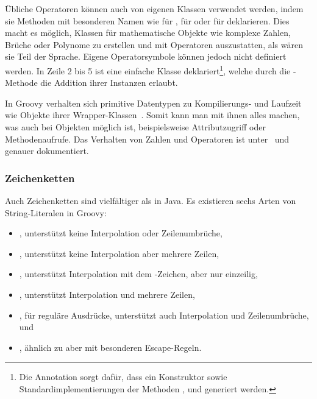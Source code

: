 \documentclass[a4paper]{article}
\begin{document}
Übliche Operatoren können auch von eigenen Klassen verwendet werden, indem sie Methoden mit besonderen Namen wie  für \code{+},  für \code{<<} oder  für \code{++} deklarieren.
Dies macht es möglich, Klassen für mathematische Objekte wie komplexe Zahlen, Brüche oder Polynome zu erstellen und mit Operatoren auszustatten, als wären sie Teil der Sprache.
Eigene Operatorsymbole können jedoch nicht definiert werden.
In Zeile 2 bis 5 ist eine einfache Klasse  deklariert\footnote{Die Annotation  sorgt dafür, dass ein Konstruktor sowie Standardimplementierungen der Methoden ,  und  generiert werden.}, welche durch die -Methode die Addition ihrer Instanzen erlaubt.

In Groovy verhalten sich primitive Datentypen zu Kompilierungs- und Laufzeit wie Objekte ihrer Wrapper-Klassen~\cite[Abs.~3.2.10.]{groovy-lang:documentation}.
Somit kann man mit ihnen alles machen, was auch bei Objekten möglich ist, beispielsweise Attributzugriff oder Methodenaufrufe.
Das Verhalten von Zahlen und Operatoren ist unter~\cite[Abs.~1.1.5.]{groovy-lang:documentation} und~\cite[Abs.~1.2.]{groovy-lang:documentation} genauer dokumentiert.

\subsubsection{Zeichenketten}\label{subsubsec:strings}

Auch Zeichenketten sind vielfältiger als in Java.
Es existieren sechs Arten von String-Literalen in Groovy:

\begin{itemize}\setlength{\itemsep}{0pt}\setlength{\parskip}{0pt}\setlength{\parsep}{0pt}
\item {}, unterstützt keine Interpolation oder Zeilenumbrüche,
\item {}, unterstützt keine Interpolation aber mehrere Zeilen,
\item {}, unterstützt Interpolation mit dem \code{$}-Zeichen, aber nur einzeilig,
\item {}, unterstützt Interpolation und mehrere Zeilen,
\item {}, für reguläre Ausdrücke, unterstützt auch Interpolation und Zeilenumbrüche, und
\item {}, ähnlich zu  aber mit besonderen Escape-Regeln.
\end{itemize}
\end{document}
